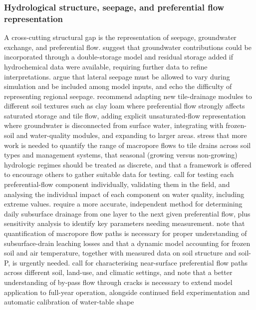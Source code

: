 \subsubsection{Hydrological structure, seepage, and preferential flow representation}

A cross-cutting structural gap is the representation of seepage, groundwater
exchange, and preferential flow. \textcite{DaneshYazdi2016} suggest that
groundwater contributions could be incorporated through a double-storage model and
residual storage added if hydrochemical data were available, requiring further
data to refine interpretations. \textcite{Feng2018} argue that lateral seepage
must be allowed to vary during simulation and be included among model inputs, and
\textcite{Kelleners2000} echo the difficulty of representing regional seepage.
\textcite{Kompanizare2024} recommend adapting new tile-drainage modules to
different soil textures such as clay loam where preferential flow strongly affects
saturated storage and tile flow, adding explicit unsaturated-flow representation
where groundwater is disconnected from surface water, integrating with frozen-soil
and water-quality modules, and expanding to larger areas. \textcite{Reid2012}
stress that more work is needed to quantify the range of macropore flows to tile
drains across soil types and management systems, that seasonal (growing versus
non-growing) hydrologic regimes should be treated as discrete, and that a
framework is offered to encourage others to gather suitable data for testing.
\textcite{Allaire2011} call for testing each preferential-flow component
individually, validating them in the field, and analysing the individual impact of
each component on water quality, including extreme values. \textcite{Ojeda2018}
require a more accurate, independent method for determining daily subsurface
drainage from one layer to the next given preferential flow, plus sensitivity
analysis to identify key parameters needing measurement. \textcite{Ulén2016} note
that quantification of macropore flow paths is necessary for proper understanding
of subsurface-drain leaching losses and that a dynamic model accounting for frozen
soil and air temperature, together with measured data on soil structure and
soil-P, is urgently needed. \textcite{Frey2012} call for characterising near-surface
preferential flow paths across different soil, land-use, and climatic settings, and
\textcite{LESAFFRE1988} note that a better understanding of by-pass flow through
cracks is necessary to extend model application to full-year operation, alongside
continued field experimentation and automatic calibration of water-table shape
